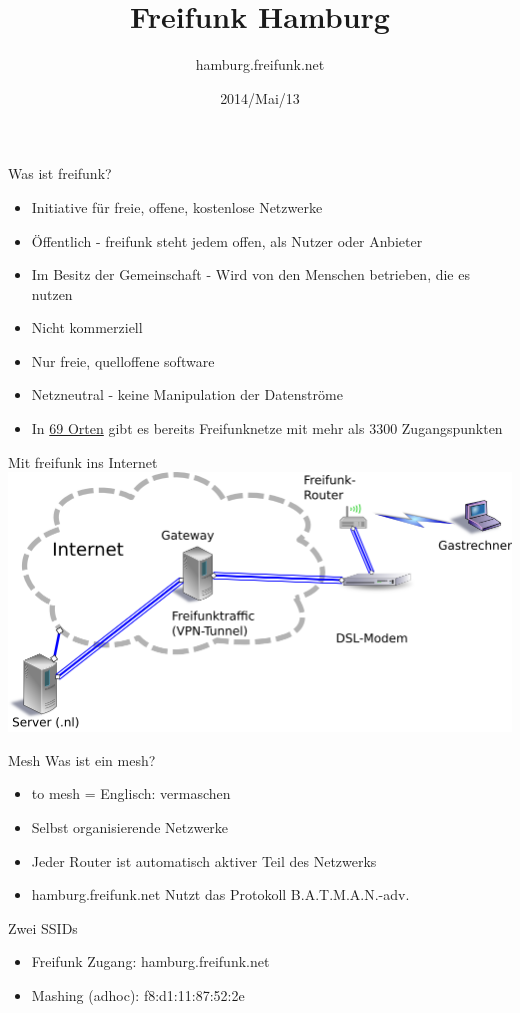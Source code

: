 \documentclass[c]{beamer}
\title{Freifunk Hamburg}
\author{hamburg.freifunk.net}
\date{2014/Mai/13}
\begin{document}
\maketitle

\begin{frame}{Was ist freifunk?}
	\begin{itemize}
		\item Initiative für freie, offene, kostenlose Netzwerke
		\item Öffentlich - freifunk steht jedem offen, als Nutzer oder Anbieter
		\item Im Besitz der Gemeinschaft - Wird von den Menschen betrieben, die es nutzen
		\item Nicht kommerziell
		\item Nur freie, quelloffene software
		\item Netzneutral - keine Manipulation der Datenströme
		\item In  \href{http://freifunk.net/wie-mache-ich-mit/community-finden/}{69 Orten} gibt es bereits Freifunknetze mit mehr als 3300 Zugangspunkten
	\end{itemize}
\end{frame}

\begin{frame}{Mit freifunk ins Internet}
	\includegraphics[width=\textwidth]{Bilder/Freifunk_Knotenanbindung}
\end{frame}


\begin{frame}{Mesh}
	Was ist ein mesh?
	\begin{itemize}
		\item to mesh = Englisch: vermaschen
		\item Selbst organisierende Netzwerke
		\item Jeder Router ist automatisch aktiver Teil des Netzwerks
		\item hamburg.freifunk.net Nutzt das Protokoll B.A.T.M.A.N.-adv.
	\end{itemize}
	Zwei SSIDs
	\begin{itemize}
		\item Freifunk Zugang: hamburg.freifunk.net
		\item Mashing (adhoc): f8:d1:11:87:52:2e
	\end{itemize}
\end{frame}
\end{document}
